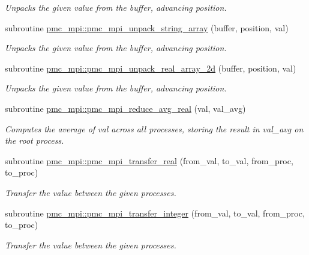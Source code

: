 \begin{DoxyCompactItemize}
\begin{DoxyCompactList}\small\item\em Unpacks the given value from the buffer, advancing position. \end{DoxyCompactList}\item 
subroutine \mbox{\hyperlink{namespacepmc__mpi_a6c069e4ccb7fa809e8b5ff2a4ec4d6c5}{pmc\+\_\+mpi\+::pmc\+\_\+mpi\+\_\+unpack\+\_\+string\+\_\+array}} (buffer, position, val)
\begin{DoxyCompactList}\small\item\em Unpacks the given value from the buffer, advancing position. \end{DoxyCompactList}\item 
subroutine \mbox{\hyperlink{namespacepmc__mpi_acbfc2d34ae601607a3e17e33bff99aaa}{pmc\+\_\+mpi\+::pmc\+\_\+mpi\+\_\+unpack\+\_\+real\+\_\+array\+\_\+2d}} (buffer, position, val)
\begin{DoxyCompactList}\small\item\em Unpacks the given value from the buffer, advancing position. \end{DoxyCompactList}\item 
subroutine \mbox{\hyperlink{namespacepmc__mpi_a0e9ea8ed3344fb38998a03e334c25a79}{pmc\+\_\+mpi\+::pmc\+\_\+mpi\+\_\+reduce\+\_\+avg\+\_\+real}} (val, val\+\_\+avg)
\begin{DoxyCompactList}\small\item\em Computes the average of val across all processes, storing the result in val\+\_\+avg on the root process. \end{DoxyCompactList}\item 
subroutine \mbox{\hyperlink{namespacepmc__mpi_a2be14fe37f7d3675ae0d59207d8cc3b1}{pmc\+\_\+mpi\+::pmc\+\_\+mpi\+\_\+transfer\+\_\+real}} (from\+\_\+val, to\+\_\+val, from\+\_\+proc, to\+\_\+proc)
\begin{DoxyCompactList}\small\item\em Transfer the value between the given processes. \end{DoxyCompactList}\item 
subroutine \mbox{\hyperlink{namespacepmc__mpi_a422d1ad4201ca47561e99dcc594207a3}{pmc\+\_\+mpi\+::pmc\+\_\+mpi\+\_\+transfer\+\_\+integer}} (from\+\_\+val, to\+\_\+val, from\+\_\+proc, to\+\_\+proc)
\begin{DoxyCompactList}\small\item\em Transfer the value between the given processes. \end{DoxyCompactList}\item 

\end{DoxyCompactItemize}
